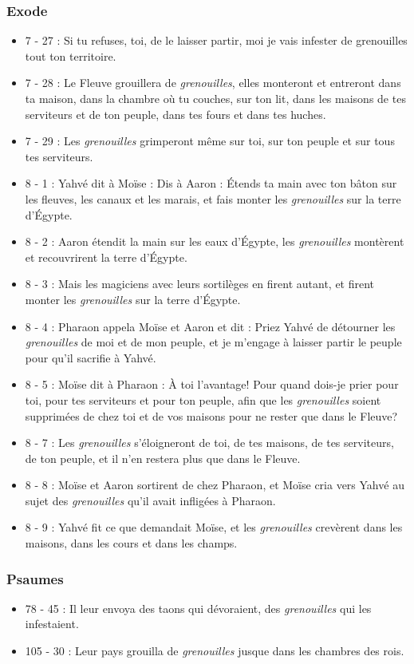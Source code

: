 \subsubsection{Exode}
\begin{itemize}
\item 7 - 27 : Si tu refuses, toi, de le laisser partir, moi je vais infester de grenouilles tout ton territoire.
\item 7 - 28 : Le Fleuve grouillera de \textit{grenouilles}, elles monteront et entreront dans ta maison, dans la chambre où tu couches, sur ton lit, dans les maisons de tes serviteurs et de ton peuple, dans tes fours et dans tes huches.
\item 7 - 29 : Les \textit{grenouilles} grimperont même sur toi, sur ton peuple et sur tous tes serviteurs.
\item 8 - 1 : Yahvé dit à Moïse : Dis à Aaron : Étends ta main avec ton bâton sur les fleuves, les canaux et les marais, et fais monter les \textit{grenouilles} sur la terre d'Égypte.
\item 8 - 2 : Aaron étendit la main sur les eaux d'Égypte, les \textit{grenouilles} montèrent et recouvrirent la terre d'Égypte.
\item 8 - 3 : Mais les magiciens avec leurs sortilèges en firent autant, et firent monter les \textit{grenouilles} sur la terre d'Égypte.
\item 8 - 4 : Pharaon appela Moïse et Aaron et dit : Priez Yahvé de détourner les \textit{grenouilles} de moi et de mon peuple, et je m'engage à laisser partir le peuple pour qu'il sacrifie à Yahvé.
\item 8 - 5 : Moïse dit à Pharaon : À toi l'avantage! Pour quand dois-je prier pour toi, pour tes serviteurs et pour ton peuple, afin que les \textit{grenouilles} soient supprimées de chez toi et de vos maisons pour ne rester que dans le Fleuve?
\item 8 - 7 : Les \textit{grenouilles} s'éloigneront de toi, de tes maisons, de tes serviteurs, de ton peuple, et il n'en restera plus que dans le Fleuve.
\item 8 - 8 : Moïse et Aaron sortirent de chez Pharaon, et Moïse cria vers Yahvé au sujet des \textit{grenouilles} qu'il avait infligées à Pharaon.
\item 8 - 9 : Yahvé fit ce que demandait Moïse, et les \textit{grenouilles} crevèrent dans les maisons, dans les cours et dans les champs.
\end{itemize}
\subsubsection{Psaumes}
\begin{itemize}
\item 78 - 45 : Il leur envoya des taons qui dévoraient, des \textit{grenouilles} qui les infestaient.
\item 105 - 30 : Leur pays grouilla de \textit{grenouilles} jusque dans les chambres des rois.
\end{itemize}
